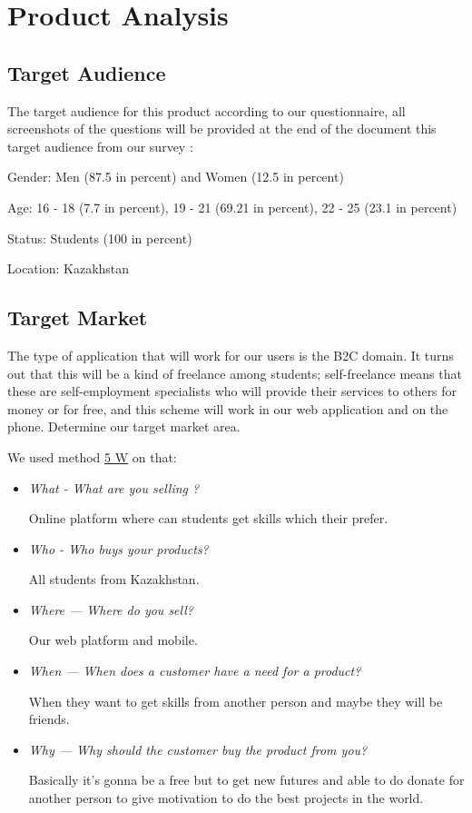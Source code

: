\section{Product Analysis}\label{prdanl}
\subsection{Target Audience}\label{trganl}

The target audience for this product according to our questionnaire, all screenshots of the questions will be provided at the end of the document this target audience from our survey \cite{survey}:
\par
Gender: Men (87.5 in percent) and Women (12.5 in percent) 
\par
Age: 16 - 18 (7.7 in percent), 19 - 21 (69.21 in percent), 22 - 25 (23.1 in percent)
\par
Status: Students (100 in percent)
\par
Location: Kazakhstan
\subsection{Target Market}\label{trgmrk}
The type of application that will work for our users is the B2C domain. It turns out that this will be a kind of freelance among students; self-freelance means that these are self-employment specialists who will provide their services to others for money or for free, and this scheme will work in our web application and on the phone. Determine our target market area. 
\par
We used method \href{https://www.insales.ru/blogs/university/metodika-5w-marka-sherringtona}{5 W} on that:
\par
\begin{itemize}
    \item \textit{What - What are you selling ?}
    \par
    Online platform where can students get skills which their prefer.
    \item \textit{Who - Who buys your products?}
    \par
    All students from Kazakhstan.
    \item \textit{Where — Where do you sell?}
\par Our web platform and mobile.
    \item \textit{When — When does a customer have a need for a product?}
\par When they want to get skills from another person and maybe they will be friends.
    \item \textit{Why — Why should the customer buy the product from you?}
    \par
    Basically it's gonna be a free but to get new futures and able to do donate for another person to give motivation to do the best projects in the world.
\end{itemize}